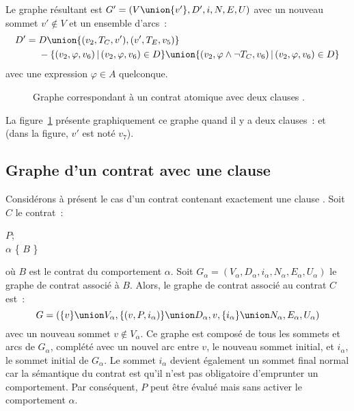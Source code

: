 Le graphe résultant est $G' = (V \union \{v'\}, D', i, N, E, U)$ avec un nouveau
sommet $v' \notin V$ et un ensemble d'arcs~:
%
\begin{align*}
%
D' =\;
  & D \union \{(v_2, T_C, v'), (v', T_E, v_5)\} \\
  & - \{(v_2, \varphi, v_6) \,\vert\, (v_2, \varphi, v_6) \in D\} \union
      \{(v_2, \varphi \land \neg T_C, v_6) \,\vert\, (v_2, \varphi, v_6) \in D\}
%
\end{align*}
%
avec une expression $\varphi \in A$ quelconque.

\begin{figure}


\caption{\label{figure:test:throwable_graph} Graphe correspondant à un contrat
atomique avec deux clauses \athrowable.}

\end{figure}

\begin{example}

La figure~\ref{figure:test:throwable_graph} présente graphiquement ce graphe
quand il y a deux clauses~:  et
 (dans la figure, $v'$ est noté
$v_7$).

\end{example}

\subsection{Graphe d'un contrat avec une clause \abehavior}
\label{subsection:test:behavior_graph}

Considérons à présent le cas d'un contrat contenant exactement une clause
\abehavior. Soit $C$ le contrat~:
%
\begin{pre}
\arequires \(P\); \\
\abehavior \(\alpha\) \{ \(B\) \}
\end{pre}
%
où $B$ est le contrat du comportement $\alpha$. Soit $G_\alpha = (V_\alpha,
D_\alpha, i_\alpha, N_\alpha, E_\alpha, U_\alpha)$ le graphe de contrat associé
à $B$. Alors, le graphe de contrat associé au contrat $C$ est~:
%
$$G = (
  \{v\} \union V_\alpha,
  \{(v, P, i_\alpha)\} \union D_\alpha,
  v,
  \{i_\alpha\} \union N_\alpha,
  E_\alpha,
  U_\alpha
)$$
%
avec un nouveau sommet $v \notin V_\alpha$. Ce graphe est composé de tous les
sommets et arcs de $G_\alpha$, complété avec un nouvel arc entre $v$, le nouveau
sommet initial, et $i_\alpha$, le sommet initial de $G_\alpha$. Le sommet
$i_\alpha$ devient également un sommet final normal car la sémantique du contrat
est qu'il n'est pas obligatoire d'emprunter un comportement. Par conséquent, $P$
peut être évalué mais sans activer le comportement $\alpha$.

